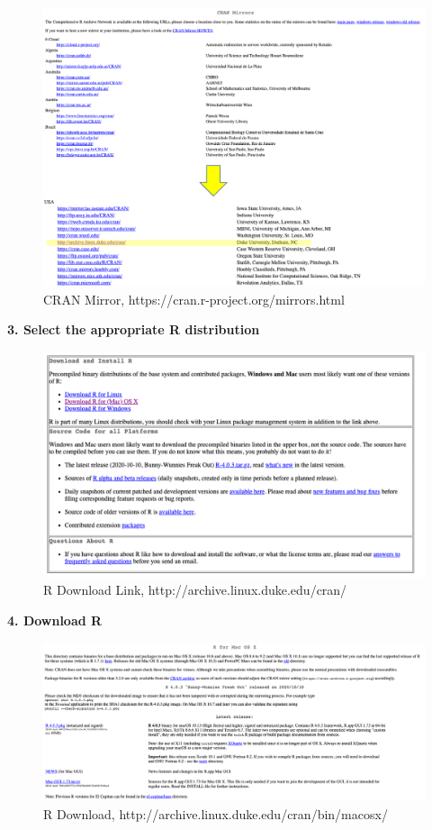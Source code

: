 \documentclass[
]{book}
\begin{document}
\begin{figure}
\includegraphics[width=17.85in]{_book/test1_files/figure-html/cran_mirrors} \caption{CRAN Mirror, https://cran.r-project.org/mirrors.html}\label{fig:mirror}
\end{figure}

\textbf{3. Select the appropriate R distribution}

\begin{figure}
\includegraphics[width=16.94in]{_book/test1_files/figure-html/duke_archive_r} \caption{R Download Link, http://archive.linux.duke.edu/cran/}\label{fig:archive}
\end{figure}

\textbf{4. Download R}

\begin{figure}
\includegraphics[width=17.93in]{_book/test1_files/figure-html/duke_download_r} \caption{R Download, http://archive.linux.duke.edu/cran/bin/macosx/}\label{fig:download}
\end{figure}
\end{document}
